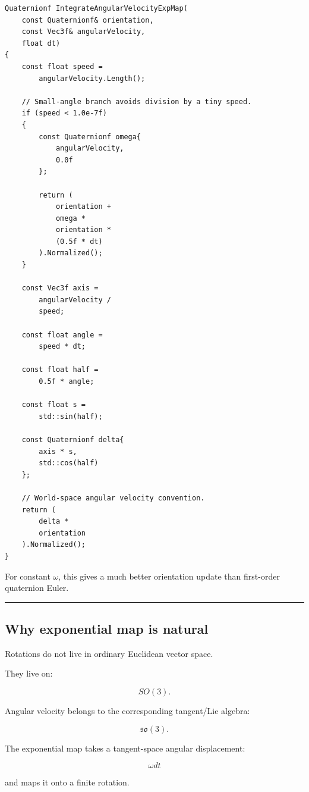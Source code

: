 \begin{verbatim}
Quaternionf IntegrateAngularVelocityExpMap(
    const Quaternionf& orientation,
    const Vec3f& angularVelocity,
    float dt)
{
    const float speed =
        angularVelocity.Length();

    // Small-angle branch avoids division by a tiny speed.
    if (speed < 1.0e-7f)
    {
        const Quaternionf omega{
            angularVelocity,
            0.0f
        };

        return (
            orientation +
            omega *
            orientation *
            (0.5f * dt)
        ).Normalized();
    }

    const Vec3f axis =
        angularVelocity /
        speed;

    const float angle =
        speed * dt;

    const float half =
        0.5f * angle;

    const float s =
        std::sin(half);

    const Quaternionf delta{
        axis * s,
        std::cos(half)
    };

    // World-space angular velocity convention.
    return (
        delta *
        orientation
    ).Normalized();
}
\end{verbatim}

For constant \(\omega\), this gives a much better orientation update than first-order quaternion Euler.

\begin{center}\rule{0.5\linewidth}{0.5pt}\end{center}

\subsection{Why exponential map is natural}\label{06-engine-ii-ch037-why-exponential-map-is-natural}

Rotations do not live in ordinary Euclidean vector space.

They live on:

\[
SO(3).
\]

Angular velocity belongs to the corresponding tangent/Lie algebra:

\[
\mathfrak{so}(3).
\]

The exponential map takes a tangent-space angular displacement:

\[
\omega dt
\]

and maps it onto a finite rotation.

